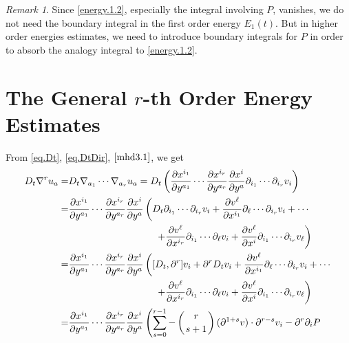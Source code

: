 \documentclass[12pt,reqno]{amsart}
\numberwithin{equation}{section}
\theoremstyle{definition}
\theoremstyle{remark}
\newtheorem{remark}[theorem]{Remark}
\begin{document}
\begin{remark}
  Since \eqref{energy.1.2}, especially the integral involving ${P }$, vanishes, we do not need the boundary integral in the first order energy $E_1(t)$. But in higher order energies estimates, we need to introduce boundary integrals for ${P }$ in order to absorb the analogy integral to \eqref{energy.1.2}.
\end{remark}

\section{The General $r$-th Order Energy Estimates}

From \eqref{eq.Dt}, \eqref{eq.DtDir}, $\eqref{mhd3.1}$, we get
\begin{align*}
  D_t{\nabla}^r u_a=&D_t{\nabla}_{a_1}\cdots {\nabla}_{a_r}u_a
  =D_t\left(\frac{{\partial} x^{i_1}}{{\partial} y^{a_1}}\cdots \frac{{\partial} x^{i_r}}{{\partial} y^{a_r}}\frac{{\partial} x^{i}}{{\partial} y^{a}}{\partial}_{i_1}\cdots {\partial}_{i_r} v_i\right)\\
  =&\frac{{\partial} x^{i_1}}{{\partial} y^{a_1}}\cdots \frac{{\partial} x^{i_r}}{{\partial} y^{a_r}}\frac{{\partial} x^{i}}{{\partial} y^{a}}\left(D_t{\partial}_{i_1}\cdots {\partial}_{i_r} v_i+\frac{{\partial} v^\ell}{{\partial} x^{i_1}}{\partial}_\ell\cdots {\partial}_{i_r} v_i+\cdots\right.\\
  &\qquad\qquad\qquad\quad\qquad\left.+\frac{{\partial} v^\ell}{{\partial} x^{i_r}} {\partial}_{i_1}\cdots {\partial}_\ell v_i+\frac{{\partial} v^\ell}{{\partial} x^i}{\partial}_{i_1}\cdots {\partial}_{i_r}v_\ell\right)\\
  =&\frac{{\partial} x^{i_1}}{{\partial} y^{a_1}}\cdots \frac{{\partial} x^{i_r}}{{\partial} y^{a_r}}\frac{{\partial} x^{i}}{{\partial} y^{a}}\left([D_t,{\partial}^r]v_i+{\partial}^r D_t v_i+\frac{{\partial} v^\ell}{{\partial} x^{i_1}}{\partial}_\ell\cdots {\partial}_{i_r} v_i+\cdots\right.\\
  &\qquad\qquad\qquad\quad\qquad\left.+\frac{{\partial} v^\ell}{{\partial} x^{i_r}} {\partial}_{i_1}\cdots {\partial}_\ell v_i+\frac{{\partial} v^\ell}{{\partial} x^i}{\partial}_{i_1}\cdots {\partial}_{i_r}v_\ell\right)\\
  =&\frac{{\partial} x^{i_1}}{{\partial} y^{a_1}}\cdots \frac{{\partial} x^{i_r}}{{\partial} y^{a_r}}\frac{{\partial} x^{i}}{{\partial} y^{a}}\left(\sum_{s=0}^{r-1}-\left(r\atop s+1\right)({\partial}^{1+s}v)\cdot {\partial}^{r-s}v_i-{\partial}^r{\partial}_i {P }\right.\\

\end{align*}
\end{document}
